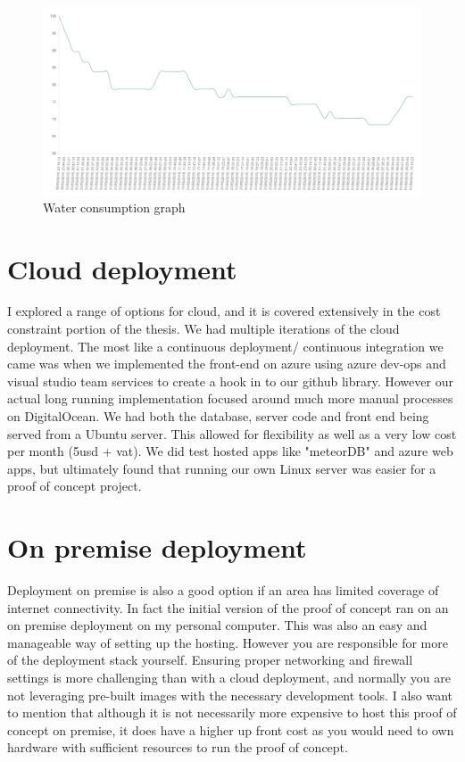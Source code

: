 \documentclass[]{uiophd}
\begin{document}
 \begin{figure}[h]
\caption{Water consumption graph}
\centering
\includegraphics[width=12cm]{watergraph.png}
\end{figure}

\section{Cloud deployment}
I explored a range of options for cloud, and it is covered extensively in the cost constraint portion of the thesis. We had multiple iterations of the cloud deployment. The most like a continuous deployment/ continuous integration we came was when we implemented the front-end on azure using azure dev-ops and visual studio team services to create a hook in to our github library. However our actual long running implementation focused around much more manual processes on DigitalOcean. We had both the database, server code and front end being served from a Ubuntu server. This allowed for flexibility as well as a very low cost per month (5usd + vat). We did test hosted apps like "meteorDB" and azure web apps, but ultimately found that running our own Linux server was easier for a proof of concept project.

\section{On premise deployment}
Deployment on premise is also a good option if an area has limited coverage of internet connectivity. In fact the initial version of the proof of concept ran on an on premise deployment on my personal computer. This was also an easy and manageable way of setting up the hosting. However you are responsible for more of the deployment stack yourself. Ensuring proper networking and firewall settings is more challenging than with a cloud deployment, and normally you are not leveraging pre-built images with the necessary development tools. I also want to mention that although it is not necessarily more expensive to host this proof of concept on premise, it does have a higher up front cost as you would need to own hardware with sufficient resources to run the proof of concept.
\end{document}
